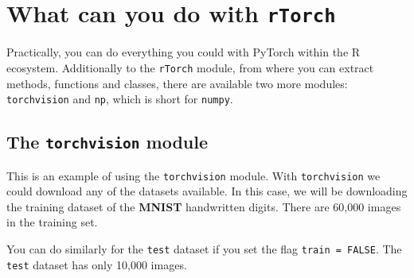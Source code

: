\documentclass[]{book}
\newenvironment{Shaded}{\begin{snugshade}}{\end{snugshade}}
\newcommand{\CommentTok}[1]{\textcolor[rgb]{0.56,0.35,0.01}{\textit{#1}}}
\newcommand{\DataTypeTok}[1]{\textcolor[rgb]{0.13,0.29,0.53}{#1}}
\newcommand{\KeywordTok}[1]{\textcolor[rgb]{0.13,0.29,0.53}{\textbf{#1}}}
\newcommand{\NormalTok}[1]{#1}
\newcommand{\OperatorTok}[1]{\textcolor[rgb]{0.81,0.36,0.00}{\textbf{#1}}}
\newcommand{\OtherTok}[1]{\textcolor[rgb]{0.56,0.35,0.01}{#1}}
\newcommand{\StringTok}[1]{\textcolor[rgb]{0.31,0.60,0.02}{#1}}
\begin{document}
\hypertarget{what-can-you-do-with-rtorch}{%
\section{\texorpdfstring{What can you do with \texttt{rTorch}}{What can you do with rTorch}}\label{what-can-you-do-with-rtorch}}

Practically, you can do everything you could with PyTorch within the R ecosystem.
Additionally to the \texttt{rTorch} module, from where you can extract methods, functions and classes, there are available two more modules: \texttt{torchvision} and \texttt{np}, which is short for \texttt{numpy}.

\hypertarget{the-torchvision-module}{%
\subsection{\texorpdfstring{The \texttt{torchvision} module}{The torchvision module}}\label{the-torchvision-module}}

This is an example of using the \texttt{torchvision} module. With \texttt{torchvision} we could download any of the datasets available. In this case, we will be downloading the training dataset of the \textbf{MNIST} handwritten digits. There are 60,000 images in the training set.

\begin{Shaded}
\end{Shaded}

You can do similarly for the \texttt{test} dataset if you set the flag \texttt{train\ =\ FALSE}. The \texttt{test} dataset has only 10,000 images.
\end{document}
